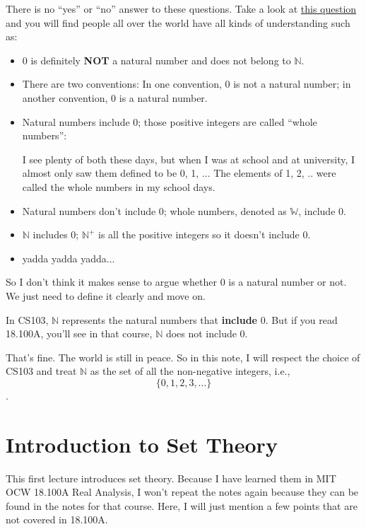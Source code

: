 \documentclass[12pt, letterpaper, oneside]{book}
\begin{document}
There is no ``yes'' or ``no'' answer to these questions. Take a look at
\href{https://math.stackexchange.com/q/283/665777}{this question} and you will
find people all over the world have all kinds of understanding such as:
\begin{itemize}
  \item $0$ is definitely \textbf{NOT} a natural number and does not belong to
        $\mathbb{N}$.
  \item There are two conventions: In one convention, $0$ is not a natural
        number; in another convention, $0$ is a natural number.
  \item Natural numbers include 0; those positive integers are called ``whole
        numbers'':
        \begin{displayquote}
          I see plenty of both these days, but when I was at school and at
          university, I almost only saw them defined to be {0, 1, ..}. The elements
          of {1, 2, ..} were called the whole numbers in my school days.
        \end{displayquote}
  \item Natural numbers don't include 0; whole numbers, denoted as $\mathbb{W}$,
        include $0$.
  \item $\mathbb{N}$ includes 0; $\mathbb{N^+}$ is all the positive integers so
        it doesn't include 0.
  \item yadda yadda yadda...
\end{itemize}

So I don't think it makes sense to argue whether $0$ is a natural number or not.
We just need to define it clearly and move on.

In CS103, $\mathbb{N}$ represents the natural numbers that \textbf{include} $0$.
But if you read 18.100A, you'll see in that course, $\mathbb{N}$ does not
include $0$.

That's fine. The world is still in peace. So in this note, I will respect the
choice of CS103 and treat $\mathbb{N}$ as the set of all the non-negative
integers, i.e., \[\{0, 1, 2, 3, \ldots\}\].

\section{Introduction to Set Theory}

This first lecture introduces set theory. Because I have learned them in MIT
OCW 18.100A Real Analysis, I won't repeat the notes again because they can be
found in the notes for that course. Here, I will just mention a few points that
are not covered in 18.100A.
\end{document}
